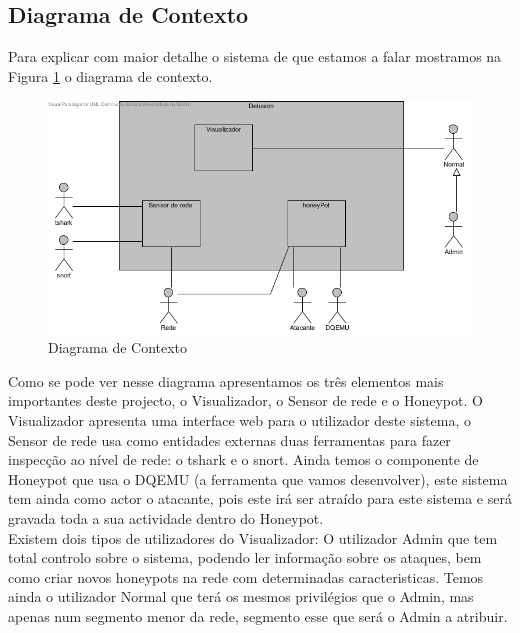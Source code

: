 \subsection{Diagrama de Contexto}
Para explicar com maior detalhe o sistema de que estamos a falar mostramos na Figura \ref{fig:dcont} o diagrama de contexto.

\begin{figure}[!htb]
\centering
\includegraphics[scale=0.8]{images/DiagramaContexto}
\caption{Diagrama de Contexto}
\label{fig:dcont}
\end{figure}

Como se pode ver nesse diagrama apresentamos os três elementos mais importantes deste projecto, o Visualizador, o Sensor de rede e o Honeypot.
O Visualizador apresenta uma interface web para o utilizador deste sistema, o Sensor de rede usa como entidades externas duas ferramentas para fazer inspecção
ao nível de rede: o tshark e o snort. Ainda temos o componente de Honeypot que usa o DQEMU (a ferramenta que vamos desenvolver), este sistema tem ainda
como actor o atacante, pois este irá ser atraído para este sistema e será gravada toda a sua actividade dentro do Honeypot.\\
Existem dois tipos de utilizadores do Visualizador: O utilizador Admin que tem total controlo sobre o sistema, podendo ler informação sobre os ataques, bem como
criar novos honeypots na rede com determinadas caracteristicas. Temos ainda o utilizador Normal que terá os mesmos privilégios que o Admin, mas apenas num
segmento menor da rede, segmento esse que será o Admin a atribuir.


